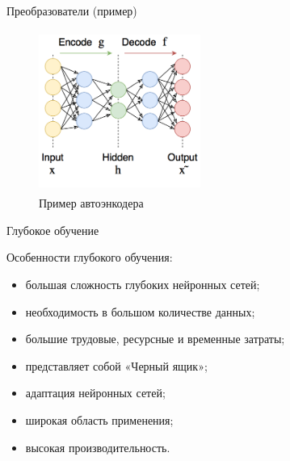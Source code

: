 \documentclass[unicode,9pt, pdf]{beamer}
\begin{document}
	\begin{frame}{Преобразователи (пример)}
	    \begin{figure}
	        \centering
	        \includegraphics[width=150pt, height=150pt]{dec.png}
	        \caption{Пример автоэнкодера}
	        \label{fig:my_label}
	    \end{figure}
	\end{frame}
	
	\begin{frame}{Глубокое обучение}

    \vspace{0.5cm}
	Особенности глубокого обучения:
        \begin{itemize}
            \item большая сложность глубоких нейронных сетей;
            \item необходимость в большом количестве данных;
            \item большие трудовые, ресурсные и временные затраты;
            \item представляет собой «Черный ящик»;
            \item адаптация нейронных сетей;
            \item широкая область применения;
            \item высокая производительность.
        
        \end{itemize}
    \vspace{0.5cm}
        
	\end{frame}	
\end{document}
